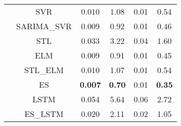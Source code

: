 {\begin{table}[H]
\begin{tabular}{c c c c c c}
 & SVR & 0.010 & 1.08 & 0.01 & 0.54 \\
 & SARIMA\_SVR & 0.009 & 0.92 & 0.01 & 0.46 \\
 & STL & 0.033 & 3.22 & 0.04 & 1.60 \\
 & ELM & 0.009 & 0.91 & 0.01 & 0.45 \\
 & STL\_ELM & 0.010 & 1.07 & 0.01 & 0.54 \\
 & ES & \bfseries 0.007 & \bfseries 0.70 & 0.01 & \bfseries 0.35 \\
 & LSTM & 0.054 & 5.64 & 0.06 & 2.72 \\
 & ES\_LSTM & 0.020 & 2.11 & 0.02 & 1.05 \\
\bottomrule
\end{tabular}
\end{table}
 }